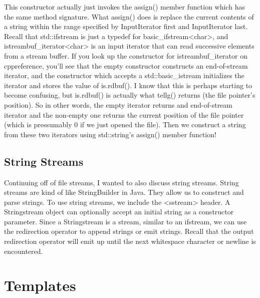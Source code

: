 \documentclass{article}
\begin{document}
This constructor actually just invokes the assign() member function which has  the same method signature.
What assign() does is replace the current contents of a string within the range specified by InputIterator
first and InputIterator last. Recall that std::ifstream is just a typedef for basic\_ifstream<char>, and
istreambuf\_iterator<char> is an input iterator that can read successive elements from a stream buffer. If
you look up the constructor for istreambuf\_iterator on cppreference, you’ll see that the empty constructor
constructs an end-of-stream iterator, and the constructor which accepts a std::basic\_istream initializes
the iterator and stores the value of is.rdbuf(). I know that this is perhaps starting to become confusing,
but is.rdbuf() is actually what tellg() returns (the file pointer’s position). So in other words, the empty
iterator returns and end-of-stream iterator and the non-empty one returns the current position of the file
pointer (which is pressumably 0 if we just opened the file). Then we construct a string from these two
iterators using std::string’s assign() member function!

\subsection{String Streams}

Continuing off of file streams, I wanted to also discuss string streams. String streams are kind of like
StringBuilder in Java. They allow us to construct and parse strings. To use string streams, we include the
<sstream> header. A Stringstream object can optionally accept an initial string as a constructor parameter.
Since a Stringstream is a stream, similar to an ifstream, we can use the redirection operator to append
strings or emit strings. Recall that the output redirection operator will emit up until the next whitespace
character or newline is encountered.

\section{Templates}
\end{document}
